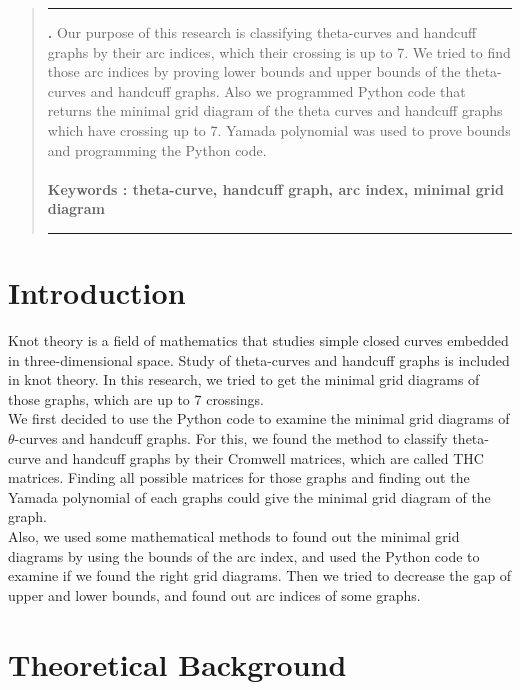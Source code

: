 \documentclass{article}
\theoremstyle{definition}
\theoremstyle{theorem}
\theoremstyle{proposition}
\theoremstyle{corollary}
\begin{document}
\renewenvironment{abstract}
{\begin{quote}
\noindent \rule{\linewidth}{.5pt}\par{\bfseries \abstractname.}}
{\medskip\noindent \rule{\linewidth}{.5pt}
\end{quote}
}

\begin{abstract}
Our purpose of this research is classifying theta-curves and handcuff graphs by their arc indices, which their crossing is up to 7.
We tried to find those arc indices by proving lower bounds and upper bounds of the theta-curves and handcuff graphs.
Also we programmed Python code that returns the minimal grid diagram of the theta curves and handcuff graphs which have crossing up to 7.
Yamada polynomial was used to prove bounds and programming the Python code.\\ \\
\textbf{Keywords : theta-curve, handcuff graph, arc index, minimal grid diagram}
\\
\end{abstract}


\section{Introduction}
Knot theory is a field of mathematics that studies simple closed curves embedded in three-dimensional space. Study of theta-curves and handcuff graphs is included in knot theory. In this research, we tried to get the minimal grid diagrams of those graphs, which are up to 7 crossings.\\ 
We first decided to use the Python code to examine the minimal grid diagrams of $\theta$-curves and handcuff graphs. For this, we found the method to classify theta-curve and handcuff graphs by their Cromwell matrices, which are called THC matrices. Finding all possible matrices for those graphs and finding out the Yamada polynomial of each graphs could give the minimal grid diagram of the graph. \\
Also, we used some mathematical methods to found out the minimal grid diagrams by using the bounds of the arc index, and used the Python code to examine if we found the right grid diagrams. Then we tried to decrease the gap of upper and lower bounds, and found out arc indices of some graphs.

\section{Theoretical Background}
\end{document}

